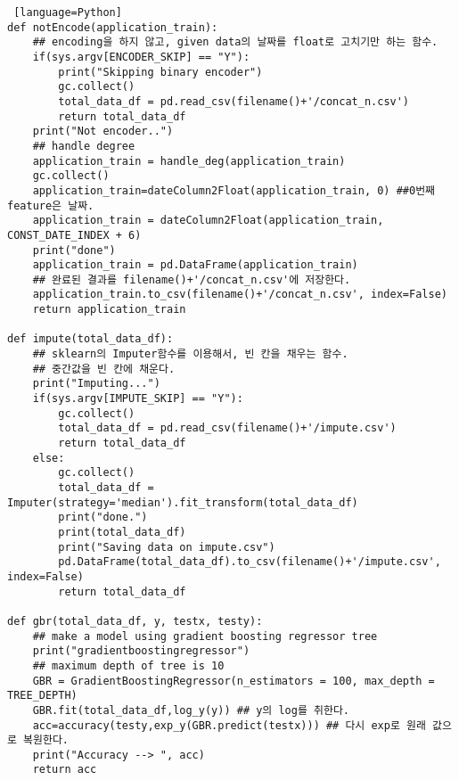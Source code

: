 \documentclass{article}
\begin{document}
\begin{lstlisting} [language=Python]
def notEncode(application_train):
    ## encoding을 하지 않고, given data의 날짜를 float로 고치기만 하는 함수.
    if(sys.argv[ENCODER_SKIP] == "Y"):
        print("Skipping binary encoder")
        gc.collect()
        total_data_df = pd.read_csv(filename()+'/concat_n.csv')
        return total_data_df
    print("Not encoder..")
    ## handle degree
    application_train = handle_deg(application_train)
    gc.collect()
    application_train=dateColumn2Float(application_train, 0) ##0번째 feature은 날짜.
    application_train = dateColumn2Float(application_train, CONST_DATE_INDEX + 6)
    print("done")
    application_train = pd.DataFrame(application_train)
    ## 완료된 결과를 filename()+'/concat_n.csv'에 저장한다.
    application_train.to_csv(filename()+'/concat_n.csv', index=False)
    return application_train

def impute(total_data_df):
    ## sklearn의 Imputer함수를 이용해서, 빈 칸을 채우는 함수.
    ## 중간값을 빈 칸에 채운다.
    print("Imputing...")
    if(sys.argv[IMPUTE_SKIP] == "Y"):
        gc.collect()
        total_data_df = pd.read_csv(filename()+'/impute.csv')
        return total_data_df
    else:
        gc.collect()
        total_data_df = Imputer(strategy='median').fit_transform(total_data_df)
        print("done.")
        print(total_data_df)
        print("Saving data on impute.csv")
        pd.DataFrame(total_data_df).to_csv(filename()+'/impute.csv', index=False)
        return total_data_df

def gbr(total_data_df, y, testx, testy):
    ## make a model using gradient boosting regressor tree
    print("gradientboostingregressor")
    ## maximum depth of tree is 10
    GBR = GradientBoostingRegressor(n_estimators = 100, max_depth = TREE_DEPTH)
    GBR.fit(total_data_df,log_y(y)) ## y의 log를 취한다.
    acc=accuracy(testy,exp_y(GBR.predict(testx))) ## 다시 exp로 원래 값으로 복원한다.
    print("Accuracy --> ", acc)
    return acc


\end{lstlisting}
\end{document}

